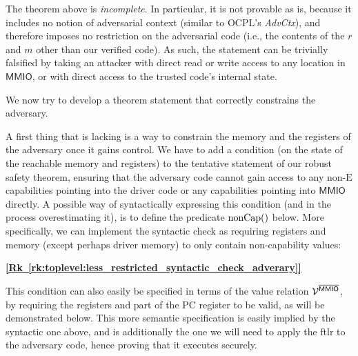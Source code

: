 \documentclass{article}
\newcommand{\X}[1]{\ensuremath{\mathrm{#1}}}
\newcommand{\V}[1]{\ensuremath{\mathit{#1}}}
\newcommand{\Sf}[1]{\ensuremath{\mathsf{#1}}}
\newcommand{\MMIO}{\Sf{MMIO}\xspace}
\newcommand{\nonCap}[1]{\ensuremath{\mathrm{nonCap}(#1)}}
\newcommand{\rk}[1]{\hyperref[{rk:#1}]{\textbf{[Rk~\ref*{rk:#1}]}}}
\begin{document}
\bigskip

The theorem above is \emph{incomplete}. In particular, it is not provable as
is, because it includes no notion of adversarial context (similar to OCPL's
\textit{AdvCtx}), and therefore imposes no restriction on the adversarial code
(i.e., the contents of the $r$ and $m$ other than our verified code).
%
As such, the statement can be trivially falsified by taking an attacker with
direct read or write access to any location in \MMIO, or with direct access to
the trusted code's internal state.

We now try to develop a theorem statement that correctly constrains the adversary.

A first thing that is lacking is a way to constrain the memory and the registers of the adversary once it gains control.
We have to add a condition (on the state of the reachable memory and registers) to the tentative statement of our robust safety theorem, ensuring that the adversary code cannot gain access to any non-$\X{E}$ capabilities pointing into the driver code or any capabilities pointing into $\MMIO$ directly.
A possible way of syntactically expressing this condition (and in the process overestimating it), is to define the predicate $\nonCap$ below.
More specifically, we can implement the syntactic check as requiring registers and memory (except perhaps driver memory) to only contain non-capability values:

\def \MathparLineskip {\lineskiplimit=0.7em\lineskip=0.7em}
\rk{toplevel:less_restricted_syntactic_check_adverary}

This condition can also easily be specified in terms of the value relation $\VR^{\notMMIO}$, by requiring the registers and part of the PC register to be valid, as will be demonstrated below. This more semantic specification is easily implied by the syntactic one above, and is additionally the one we will need to apply the ftlr to the adversary code, hence proving that it executes securely.
\end{document}
